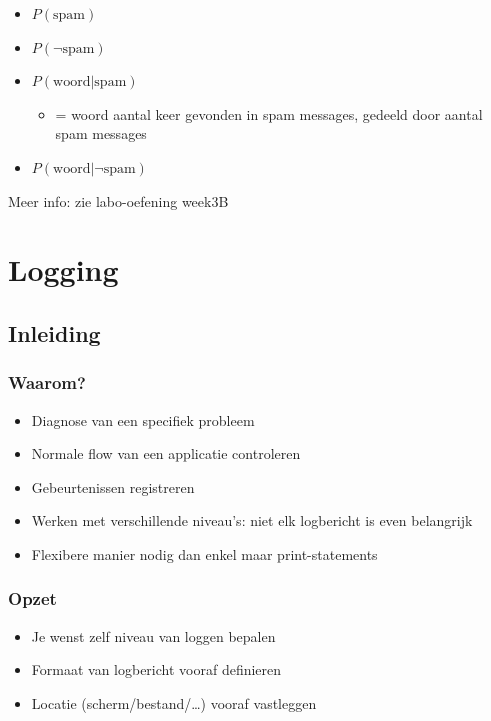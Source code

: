 \documentclass{article}
\begin{document}
\begin{itemize}
    \item $P(\text{spam})$
    \item $P(\neg \text{spam})$
    \item $P(\text{woord}|\text{spam})$
    \begin{itemize}
        \item = woord aantal keer gevonden in spam messages, gedeeld door aantal spam messages
    \end{itemize}
    \item $P(\text{woord}|\neg \text{spam})$
\end{itemize}

Meer info: zie labo-oefening week3B


\section{Logging}

\subsection{Inleiding}

\subsubsection{Waarom?}

\begin{itemize}
    \item Diagnose van een specifiek probleem
    \item Normale flow van een applicatie controleren
    \item Gebeurtenissen registreren
    \item Werken met verschillende niveau's: niet elk logbericht is even belangrijk
    \item Flexibere manier nodig dan enkel maar print-statements
\end{itemize}

\subsubsection{Opzet}

\begin{itemize}
    \item Je wenst zelf niveau van loggen bepalen
    \item Formaat van logbericht vooraf definieren
    \item Locatie (scherm/bestand/\dots) vooraf vastleggen
\end{itemize}
\end{document}
